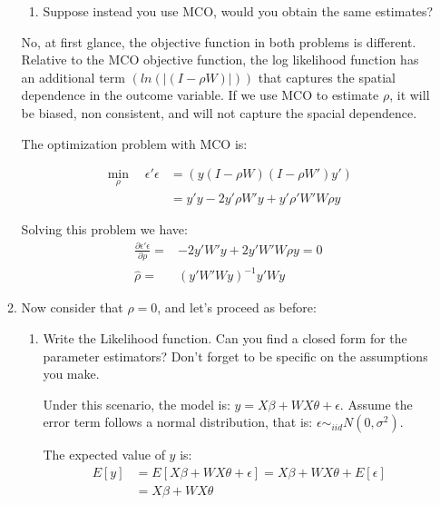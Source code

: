 \documentclass[12pt]{article}
\begin{document}
\begin{enumerate}
\begin{enumerate}
\begin{enumerate}
     
      \item Suppose instead you use MCO, would you obtain the same estimates? 
    \end{enumerate}  
    
        No, at first glance, the objective function in both problems is different. Relative to the MCO objective function, the log likelihood function has an additional term $(ln(|(I-\rho W)|))$ that captures the spatial dependence in the outcome variable. If we use MCO to estimate $\rho$, it will be biased, non consistent, and will not capture the spacial dependence.
        
        The optimization problem with MCO is:
        
        \begin{align*}
          \min_{\rho} \quad \epsilon'\epsilon &=  (y (I-\rho W) (I-\rho W')  y') \\
          &= y'y- 2y' \rho W' y + y' \rho' W' W \rho y
      \end{align*}
      
        Solving this problem we have:
         \begin{align*}
            \frac{\partial \epsilon'\epsilon}{\partial \rho} =&  -2y'W'y + 2 y'W'W \rho y= 0\\
            \hat{\rho} =& (y'W'Wy)^{-1}y'Wy
         \end{align*}
    \item Now consider that $\rho=0$, and let's proceed as before:
    \begin{enumerate}
      \item Write the Likelihood function. Can you find a closed form for the parameter estimators? Don't forget to be specific on the assumptions you make.
      
      \vspace{0.5cm}
       Under this scenario, the model is: $y=X\beta + WX\theta +\epsilon$. Assume the error term follows a normal distribution, that is: $\epsilon \sim_{iid} N(0,\sigma^2)$.
      
      The expected value of $y$ is:
      \begin{align}
          E[y] &= E[X\beta + WX\theta +\epsilon] = X\beta + WX\theta + E[ \epsilon ] \nonumber\\
          &= X\beta + WX\theta
           \label{ExpectedValue2} 
      \end{align}
      

\end{enumerate}
\end{enumerate}
\end{enumerate}
\end{document}
